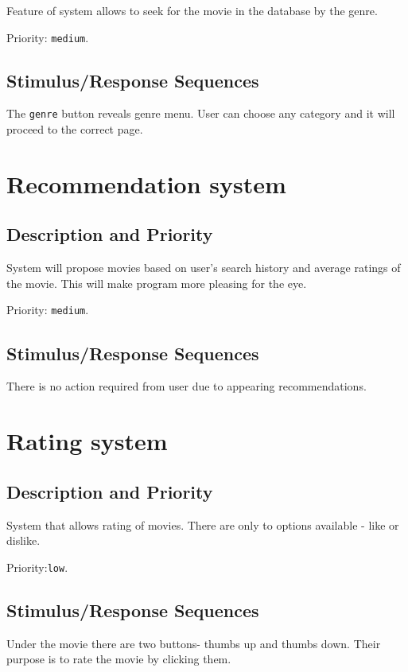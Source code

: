 \documentclass{scrreprt}
\begin{document}
Feature of system allows to seek for the movie in the database by the genre.

Priority: \verb|medium|.

\subsection{Stimulus/Response Sequences}

The \verb|genre| button reveals genre menu. User can choose any category and it will proceed to the correct page.  

\section{ Recommendation system}

\subsection{Description and Priority}


System will propose movies based on user's search history and average ratings of the movie. This will make program more pleasing for the eye.

Priority: \verb|medium|.

\subsection{Stimulus/Response Sequences}


There is no action required from user due to appearing recommendations.

\section{Rating system}
\subsection{Description and Priority}

System that allows rating of movies. There are only to options available - like or dislike.

Priority:\verb|low|.

\subsection{Stimulus/Response Sequences}

Under the movie there are two buttons- thumbs up and thumbs down. Their purpose is to rate the movie by clicking them.
\end{document}
